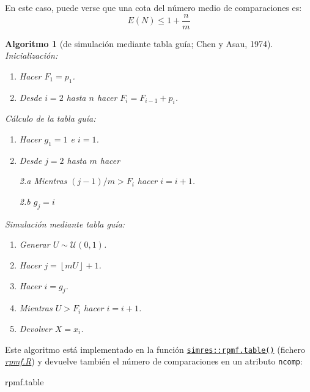 \documentclass[
  10pt,
]{book}
\newenvironment{Shaded}{\begin{snugshade}}{\end{snugshade}}
\newcommand{\NormalTok}[1]{#1}
\theoremstyle{break}
\newtheorem{conjecture}{Algoritmo}[chapter]
\theoremstyle{nonumberplain}
\begin{document}
En este caso, puede verse que una cota del número medio de comparaciones es:
\[E\left( N\right) \leq 1+\frac{n}{m}\]

\begin{conjecture}[de simulación mediante tabla guía; Chen y Asau, 1974]

Inicialización:

\begin{enumerate}
\def\labelenumi{\arabic{enumi}.}
\item
  Hacer \(F_{1}=p_{1}\).
\item
  Desde \(i=2\) hasta \(n\) hacer \(F_{i}=F_{i-1}+p_{i}\).
\end{enumerate}

Cálculo de la tabla guía:

\begin{enumerate}
\def\labelenumi{\arabic{enumi}.}
\item
  Hacer \(g_{1}=1\) e \(i=1\).
\item
  Desde \(j=2\) hasta \(m\) hacer

  2.a Mientras \((j-1)/m>F_{i}\) hacer \(i=i+1\).

  2.b \(g_{j}=i\)
\end{enumerate}

Simulación mediante tabla guía:

\begin{enumerate}
\def\labelenumi{\arabic{enumi}.}
\item
  Generar \(U\sim \mathcal{U}\left( 0,1\right)\).
\item
  Hacer \(j=\left\lfloor mU\right\rfloor +1\).
\item
  Hacer \(i=g_{j}\).
\item
  Mientras \(U>F_{i}\) hacer \(i=i+1\).
\item
  Devolver \(X=x_{i}\).
\end{enumerate}

\end{conjecture}

Este algoritmo está implementado en la función \href{https://rubenfcasal.github.io/simres/reference/rpmf.table.html}{\texttt{simres::rpmf.table()}} (fichero \href{R/rpmf.R}{\emph{rpmf.R}}) y devuelve también el número de comparaciones en un atributo \texttt{ncomp}:

\begin{Shaded}
\begin{Highlighting}[]
\NormalTok{rpmf.table}
\end{Highlighting}
\end{Shaded}
\end{document}
